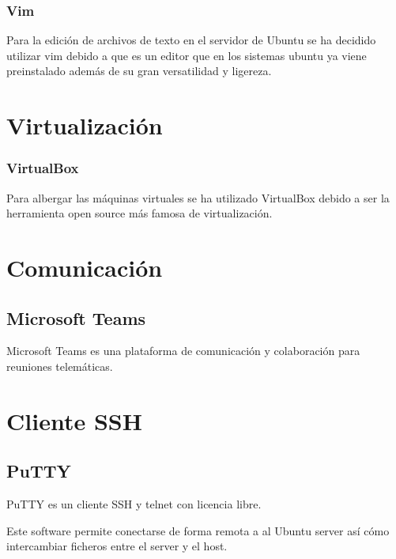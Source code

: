 \subsubsection{Vim}
Para la edición de archivos de texto en el servidor de Ubuntu se ha decidido utilizar vim debido a que es un editor que en los sistemas ubuntu ya viene preinstalado además de su gran versatilidad y ligereza.

\section{Virtualización}

\subsubsection{VirtualBox}
Para albergar las máquinas virtuales se ha utilizado VirtualBox debido a ser la herramienta open source más famosa de virtualización.

\begin{comment}

\section{Procesadores de lenguaje}
Herramientas consideradas: Flex, Bison, JavaCC

Debido a la baja complejidad y el poco uso que le iba a dar a esta herramienta he decidido utilizar Flex, un analizador de lenguaje open source.
\end{comment}

\section{Comunicación}
\subsection{Microsoft Teams}
Microsoft Teams es una plataforma de comunicación y colaboración para reuniones telemáticas.

\section{Cliente SSH}
\subsection{PuTTY}
PuTTY es un cliente SSH  y telnet con licencia libre.

Este software permite conectarse de forma remota a al Ubuntu server así cómo intercambiar ficheros entre el server y el host.

